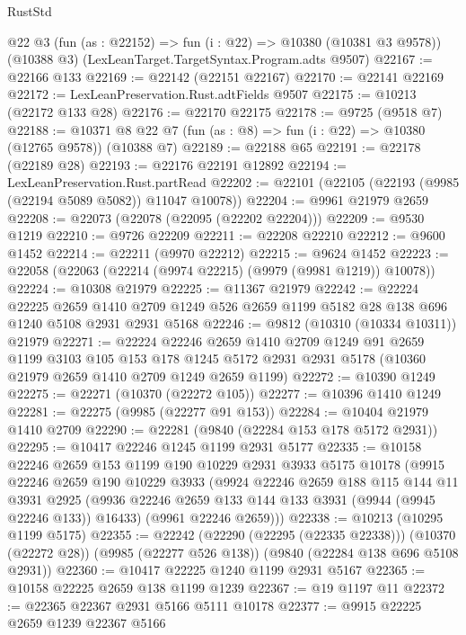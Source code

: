 \begin{lexlean}{RustStd}
\begin{coremodule}
    @22
    @3
    (fun (as : @22152) => fun (i : @22) => @10380 (@10381 @3 @9578))
    (@10388 @3)
    (LexLeanTarget.TargetSyntax.Program.adts @9507)
@22167 := @22166 @133
@22169 := @22142 (@22151 @22167)
@22170 := @22141 @22169
@22172 := LexLeanPreservation.Rust.adtFields @9507
@22175 := @10213 (@22172 @133 @28)
@22176 := @22170 @22175
@22178 := @9725 (@9518 @7)
@22188 := @10371 @8 @22 @7 (fun (as : @8) => fun (i : @22) => @10380 (@12765 @9578)) (@10388 @7)
@22189 := @22188 @65
@22191 := @22178 (@22189 @28)
@22193 := @22176 @22191 @12892
@22194 := LexLeanPreservation.Rust.partRead
@22202 := @22101 (@22105 (@22193 (@9985 (@22194 @5089 @5082)) @11047 @10078))
@22204 := @9961 @21979 @2659
@22208 := @22073 (@22078 (@22095 (@22202 @22204)))
@22209 := @9530 @1219
@22210 := @9726 @22209
@22211 := @22208 @22210
@22212 := @9600 @1452
@22214 := @22211 (@9970 @22212)
@22215 := @9624 @1452
@22223 := @22058 (@22063 (@22214 (@9974 @22215) (@9979 (@9981 @1219)) @10078))
@22224 := @10308 @21979
@22225 := @11367 @21979
@22242 := @22224
    @22225
    @2659
    @1410
    @2709
    @1249
    @526
    @2659
    @1199
    @5182
    @28
    @138
    @696
    @1240
    @5108
    @2931
    @2931
    @5168
@22246 := @9812 (@10310 (@10334 @10311)) @21979
@22271 := @22224
    @22246
    @2659
    @1410
    @2709
    @1249
    @91
    @2659
    @1199
    @3103
    @105
    @153
    @178
    @1245
    @5172
    @2931
    @2931
    @5178
    (@10360 @21979 @2659 @1410 @2709 @1249 @2659 @1199)
@22272 := @10390 @1249
@22275 := @22271 (@10370 (@22272 @105))
@22277 := @10396 @1410 @1249
@22281 := @22275 (@9985 (@22277 @91 @153))
@22284 := @10404 @21979 @1410 @2709
@22290 := @22281 (@9840 (@22284 @153 @178 @5172 @2931))
@22295 := @10417 @22246 @1245 @1199 @2931 @5177
@22335 := @10158
    @22246
    @2659
    @153
    @1199
    @190
    @10229
    @2931
    @3933
    @5175
    @10178
    (@9915
      @22246
      @2659
      @190
      @10229
      @3933
      (@9924
        @22246
        @2659
        @188
        @115
        @144
        @11
        @3931
        @2925
        (@9936 @22246 @2659 @133 @144 @133 @3931 (@9944 (@9945 @22246 @133)) @16433)
        (@9961 @22246 @2659)))
@22338 := @10213 (@10295 @1199 @5175)
@22355 := @22242
    (@22290 (@22295 (@22335 @22338)))
    (@10370 (@22272 @28))
    (@9985 (@22277 @526 @138))
    (@9840 (@22284 @138 @696 @5108 @2931))
@22360 := @10417 @22225 @1240 @1199 @2931 @5167
@22365 := @10158 @22225 @2659 @138 @1199 @1239
@22367 := @19 @1197 @11
@22372 := @22365 @22367 @2931 @5166 @5111 @10178
@22377 := @9915 @22225 @2659 @1239 @22367 @5166

\end{coremodule}
\end{lexlean}
